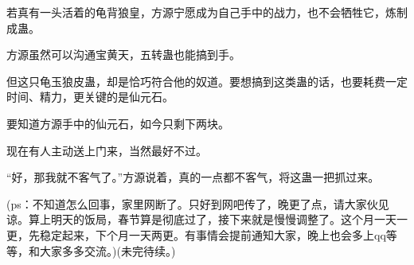 \begin{this_body}
若真有一头活着的龟背狼皇，方源宁愿成为自己手中的战力，也不会牺牲它，炼制成蛊。

方源虽然可以沟通宝黄天，五转蛊也能搞到手。

但这只龟玉狼皮蛊，却是恰巧符合他的奴道。要想搞到这类蛊的话，也要耗费一定时间、精力，更关键的是仙元石。

要知道方源手中的仙元石，如今只剩下两块。

现在有人主动送上门来，当然最好不过。

“好，那我就不客气了。”方源说着，真的一点都不客气，将这蛊一把抓过来。

(ps：不知道怎么回事，家里网断了。只好到网吧传了，晚更了点，请大家伙见谅。算上明天的饭局，春节算是彻底过了，接下来就是慢慢调整了。这个月一天一更，先稳定起来，下个月一天两更。有事情会提前通知大家，晚上也会多上qq等等，和大家多多交流。)(未完待续。)

\end{this_body}


